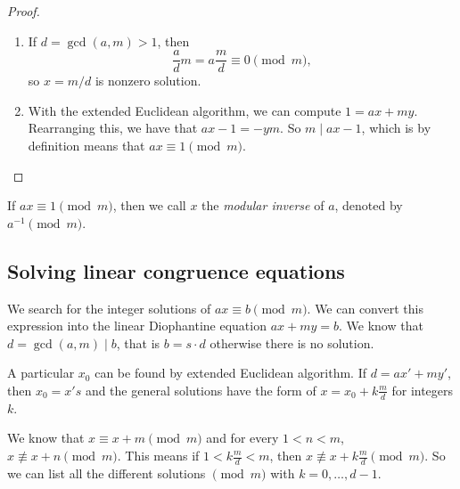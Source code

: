 \documentclass{article}
\begin{document}
\begin{proof}
    \begin{enumerate}
        \item
            If $d = \gcd(a, m) > 1$, then
            \[
                \frac{a}{d}m = a\frac{m}{d} \equiv 0 \pmod{m},
            \]
            so $x = m / d$ is nonzero solution.
        \item
            With the extended Euclidean algorithm, we can compute $1 = ax + my$.
            Rearranging this, we have that $ax - 1 = -ym$. So $m \mid ax - 1$, which is by definition means that $ax \equiv 1 \pmod{m}$.
    \end{enumerate}
\end{proof}
If $ax \equiv 1 \pmod{m}$, then we call $x$ the \emph{modular inverse} of $a$, denoted by $a^{-1}\pmod{m}$.

\subsection{Solving linear congruence equations}

We search for the integer solutions of $ax \equiv b \pmod{m}$.
We can convert this expression into the linear Diophantine equation $ax+my=b$.
We know that $d = \gcd(a,m) \mid b$, that is $b = s \cdot d$ otherwise there is no solution.

A particular $x_0$ can be found by extended Euclidean algorithm.
If $d = ax'+my'$, then $x_0=x's$ and the general solutions have the form of $x = x_0 + k\frac{m}{d}$ for integers $k$.

We know that $x \equiv x + m \pmod{m}$ and for every $1 < n < m$, $x \not \equiv x+n \pmod{m}$.
This means if $1 < k\frac{m}{d} < m$, then $x \not\equiv x+k\frac{m}{d} \pmod{m}$.
So we can list all the different solutions $\pmod{m}$ with $k=0,\ldots,d-1$.
\end{document}

